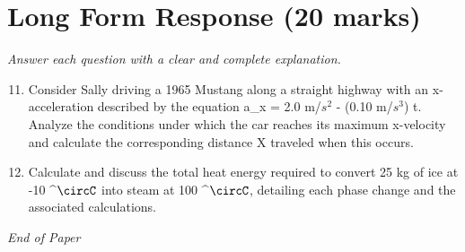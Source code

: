 \documentclass[12pt]{article}
\begin{document}
\section*{Long Form Response (20 marks)}
\textit{Answer each question with a clear and complete explanation.}
\begin{enumerate}[label=\arabic*.]
\setcounter{enumi}{10}
\item Consider Sally driving a 1965 Mustang along a straight highway with an x-acceleration described by the equation a\_x = 2.0 m/$s^2$ - (0.10 m/$s^3$) t. Analyze the conditions under which the car reaches its maximum x-velocity and calculate the corresponding distance X traveled when this occurs.
\item Calculate and discuss the total heat energy required to convert 25 kg of ice at -10 ^\ensuremath{\circC} into steam at 100 ^\ensuremath{\circC}, detailing each phase change and the associated calculations.
\end{enumerate}

\vfill
\noindent\textit{End of Paper}
\end{document}
